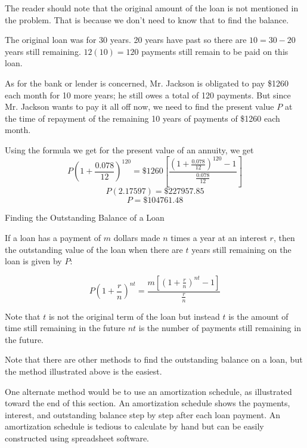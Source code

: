 \begin{solution}
    The reader should note that the original amount of the loan is not mentioned in the problem. That is because we don't need to know that to find the balance.

    The original loan was for 30 years. 20 years have past so there are \(10 = 30 - 20\) years still remaining. \(12(10) = 120\) payments still remain to be paid on this loan.

    As for the bank or lender is concerned, Mr. Jackson is obligated to pay \$1260 each month for 10 more years; he still owes a total of 120 payments. But since Mr. Jackson wants to pay it all off now, we need to find the present value \( P \) at the time of repayment of the remaining 10 years of payments of \$1260 each month.

    Using the formula we get for the present value of an annuity, we get
    \[ P\left(1 + \frac{0.078}{12}\right)^{120} = \$1260 \left[ \frac{(1+\frac{0.078}{12})^{120}-1}{\frac{0.078}{12}} \right] \]
    \[ P (2.17597) = \$227957.85 \]
    \[ P = \$104761.48 \]
\end{solution}

\begin{summarybox}{Finding the Outstanding Balance of a Loan}

    If a loan has a payment of \( m \) dollars made \( n \) times a year at an interest \( r \), then the outstanding value of the loan when there are \( t \) years still remaining on the loan is given by \( P \):

    \[
        P\left(1 + \frac{r}{n}\right)^{nt} = \frac{m\left[(1 + \frac{r}{n})^{nt} - 1\right]}{\frac{r}{n}}
    \]

    Note that \( t \) is not the original term of the loan but instead \( t \) is the amount of time still remaining in the future \( nt \) is the number of payments still remaining in the future.

\end{summarybox}

Note that there are other methods to find the outstanding balance on a loan, but the method illustrated above is the easiest.

One alternate method would be to use an amortization schedule, as illustrated toward the end of this section. An amortization schedule shows the payments, interest, and outstanding balance step by step after each loan payment. An amortization schedule is tedious to calculate by hand but can be easily constructed using spreadsheet software.

